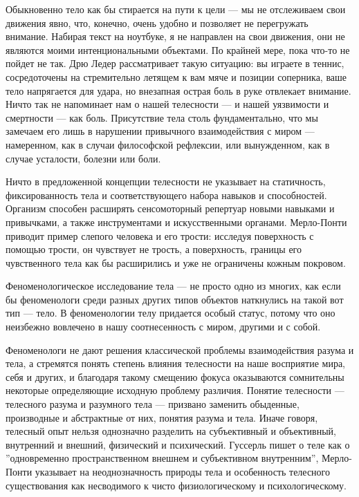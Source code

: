 \documentclass[11pt]{book}
\begin{document}
Обыкновенно тело как бы стирается на пути к цели --- мы не отслеживаем свои движения явно, что, конечно, очень удобно и позволяет не перегружать внимание. Набирая текст на ноутбуке, я не направлен на свои движения, они не являются моими интенциональными объектами. По крайней мере, пока что-то не пойдет не так. Дрю Ледер рассматривает такую ситуацию: вы играете в теннис, сосредоточены на стремительно летящем к вам мяче и позиции соперника, ваше тело напрягается для удара, но внезапная острая боль в руке отвлекает внимание. Ничто так не напоминает нам о нашей телесности --- и нашей уязвимости и смертности --- как боль. Присутствие тела столь фундаментально, что мы замечаем его лишь в нарушении привычного взаимодействия с миром --- намеренном, как в случаи философской рефлексии, или вынужденном, как в случае усталости, болезни или боли.

Ничто в предложенной концепции телесности не указывает на статичность, фиксированность тела и соответствующего набора навыков и способностей. Организм способен расширять сенсомоторный репертуар новыми навыками и привычками, а также инструментами и искусственными органами. Мерло-Понти приводит пример слепого человека и его трости: исследуя поверхность с помощью трости, он чувствует не трость, а поверхность, границы его чувственного тела как бы расширились и уже не ограничены кожным покровом.

Феноменологическое исследование тела --- не просто одно из многих, как если бы феноменологи среди разных других типов объектов наткнулись на такой вот тип --- тело. В феноменологии телу придается особый статус, потому что оно неизбежно вовлечено в нашу соотнесенность с миром, другими и с собой.

Феноменологи не дают решения классической проблемы взаимодействия разума и тела, а стремятся понять степень влияния телесности на наше восприятие мира, себя и других, и благодаря такому смещению фокуса оказываются сомнительны некоторые определяющие исходную проблему различия. Понятие телесности --- телесного разума и разумного тела --- призвано заменить обыденные, производные и абстрактные от них, понятия разума и тела. Иначе говоря, телесный опыт нельзя однозначно разделить на субъективный и объективный, внутренний и внешний, физический и психический. Гуссерль пишет о теле как о ''одновременно пространственном внешнем и субъективном внутренним'', Мерло-Понти указывает на неоднозначность природы тела и особенность телесного существования как несводимого к чисто физиологическому и психологическому.
\end{document}
